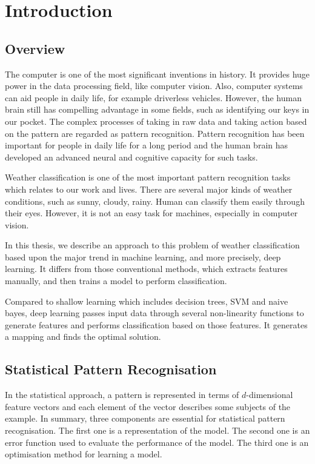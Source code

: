 \chapter{Introduction} %
\label{Chapter1}


\section{Overview}

The computer is one of the most significant inventions in history. It provides huge power in the data processing field, like computer vision. Also, computer systems can aid people in daily life, for example driverless vehicles. However, the human brain still has compelling advantage in some fields, such as identifying our keys in our pocket. The complex processes of taking in raw data and taking action based on the pattern are regarded as pattern recognition. Pattern recognition has been important for people in daily life for a long period and the human brain has developed an advanced neural and cognitive capacity for such tasks.

Weather classification is one of the most important pattern recognition tasks which relates to our work and lives. There are several major kinds of weather conditions, such as sunny, cloudy, rainy. Human can classify them easily through their eyes. However, it is not an easy task for machines, especially in computer vision. 

In this thesis, we describe an approach to this problem of weather classification based upon the major trend in machine learning, and more precisely, deep learning. It differs from those conventional methods, which extracts features manually, and then trains a model to perform classification.

Compared to shallow learning which includes decision trees, SVM and naive bayes, deep learning passes input data through several non-linearity functions to generate features and performs classification based on those features. It generates a mapping and finds the optimal solution.

\section{Statistical Pattern Recognisation}

In the statistical approach, a pattern is represented in terms of $d$-dimensional feature vectors and each element of the vector describes some subjects of the example. In summary, three components are essential for statistical pattern recognisation. The first one is a representation of the model. The second one is an error function used to evaluate the performance of the model. The third one is an optimisation method for learning a model.


